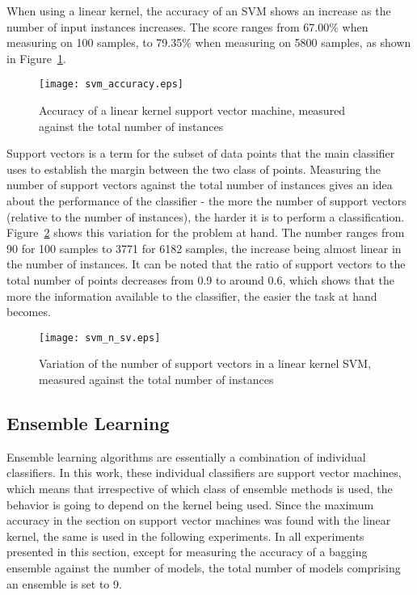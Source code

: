 When using a linear kernel, the accuracy of an SVM shows an increase as the number of input instances increases. The score ranges from 67.00\% when measuring on 100 samples, to 79.35\% when measuring on 5800 samples, as shown in Figure~\ref{fig:svm_accuracy}.\\

\begin{figure}
    \centering
    \texttt{[image: svm\_accuracy.eps]}
    \caption{Accuracy of a linear kernel support vector machine, measured against the total number of instances}
    \label{fig:svm_accuracy}
\end{figure}

Support vectors is a term for the subset of data points that the main classifier uses to establish the margin between the two class of points. Measuring the number of support vectors against the total number of instances gives an idea about the performance of the classifier - the more the number of support vectors (relative to the number of instances), the harder it is to perform a classification. Figure~\ref{fig:svm_n_sv} shows this variation for the problem at hand. The number ranges from 90 for 100 samples to 3771 for 6182 samples, the increase being almost linear in the number of instances. It can be noted that the ratio of support vectors to the total number of points decreases from 0.9 to around 0.6, which shows that the more the information available to the classifier, the easier the task at hand becomes.

\begin{figure}
    \centering
    \texttt{[image: svm\_n\_sv.eps]}
    \caption{Variation of the number of support vectors in a linear kernel SVM, measured against the total number of instances}
    \label{fig:svm_n_sv}
\end{figure}

\subsection{Ensemble Learning}
Ensemble learning algorithms are essentially a combination of individual classifiers. In this work, these individual classifiers are support vector machines, which means that irrespective of which class of ensemble methods is used, the behavior is going to depend on the kernel being used. Since the maximum accuracy in the section on support vector machines was found with the linear kernel, the same is used in the following experiments. In all experiments presented in this section, except for measuring the accuracy of a bagging ensemble against the number of models, the total number of models comprising an ensemble is set to 9.

